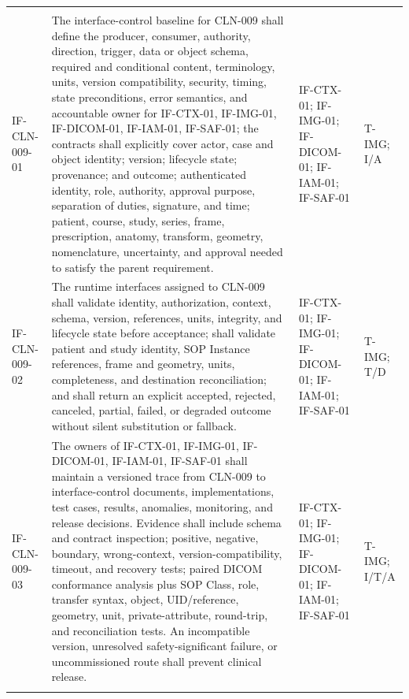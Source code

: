 \documentclass[11pt,letterpaper]{article}
\begin{document}
\begin{scriptsize}
\begin{longtable}{@{}L{0.14\textwidth}L{0.49\textwidth}L{0.19\textwidth}L{0.10\textwidth}@{}}
\addlinespace[2pt]
 \\
\addlinespace[2pt]
\mbox{IF-CLN-009-01} & The interface-control baseline for CLN-009 shall define the producer, consumer, authority, direction, trigger, data or object schema, required and conditional content, terminology, units, version compatibility, security, timing, state preconditions, error semantics, and accountable owner for IF-CTX-01, IF-IMG-01, IF-DICOM-01, IF-IAM-01, IF-SAF-01; the contracts shall explicitly cover actor, case and object identity; version; lifecycle state; provenance; and outcome; authenticated identity, role, authority, approval purpose, separation of duties, signature, and time; patient, course, study, series, frame, prescription, anatomy, transform, geometry, nomenclature, uncertainty, and approval needed to satisfy the parent requirement. & IF-CTX-01; IF-IMG-01; IF-DICOM-01; IF-IAM-01; IF-SAF-01 & T-IMG; I\slash\allowbreak{}A \\
\addlinespace[2pt]
\mbox{IF-CLN-009-02} & The runtime interfaces assigned to CLN-009 shall validate identity, authorization, context, schema, version, references, units, integrity, and lifecycle state before acceptance; shall validate patient and study identity, SOP Instance references, frame and geometry, units, completeness, and destination reconciliation; and shall return an explicit accepted, rejected, canceled, partial, failed, or degraded outcome without silent substitution or fallback. & IF-CTX-01; IF-IMG-01; IF-DICOM-01; IF-IAM-01; IF-SAF-01 & T-IMG; T\slash\allowbreak{}D \\
\addlinespace[2pt]
\mbox{IF-CLN-009-03} & The owners of IF-CTX-01, IF-IMG-01, IF-DICOM-01, IF-IAM-01, IF-SAF-01 shall maintain a versioned trace from CLN-009 to interface-control documents, implementations, test cases, results, anomalies, monitoring, and release decisions. Evidence shall include schema and contract inspection; positive, negative, boundary, wrong-context, version-compatibility, timeout, and recovery tests; paired DICOM conformance analysis plus SOP Class, role, transfer syntax, object, UID\slash\allowbreak{}reference, geometry, unit, private-attribute, round-trip, and reconciliation tests. An incompatible version, unresolved safety-significant failure, or uncommissioned route shall prevent clinical release. & IF-CTX-01; IF-IMG-01; IF-DICOM-01; IF-IAM-01; IF-SAF-01 & T-IMG; I\slash\allowbreak{}T\slash\allowbreak{}A \\
\addlinespace[2pt]
\end{longtable}
\end{scriptsize}
\end{document}
